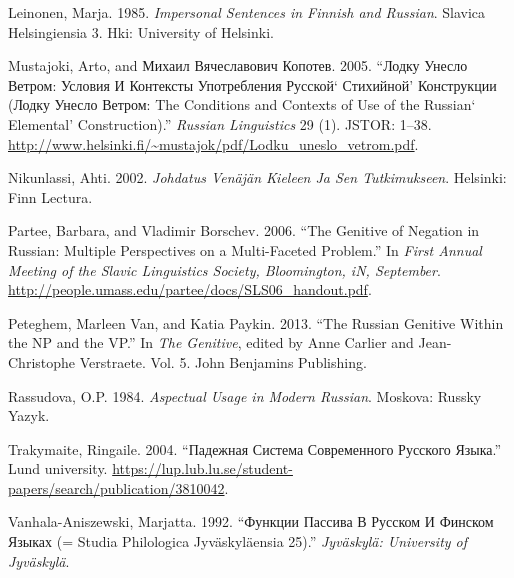 \documentclass[]{scrreprt}
\begin{document}
Leinonen, Marja. 1985. \emph{Impersonal Sentences in Finnish and
Russian}. Slavica Helsingiensia 3. Hki: University of Helsinki. \\

Mustajoki, Arto, and Михаил Вячеславович Копотев. 2005. ``Лодку Унесло
Ветром: Условия И Контексты Употребления Русской` Стихийной' Конструкции
(Лодку Унесло Ветром: The Conditions and Contexts of Use of the Russian`
Elemental' Construction).'' \emph{Russian Linguistics} 29 (1). JSTOR:
1--38.
\url{http://www.helsinki.fi/~mustajok/pdf/Lodku_uneslo_vetrom.pdf}. \\

Nikunlassi, Ahti. 2002. \emph{Johdatus Venäjän Kieleen Ja Sen
Tutkimukseen}. Helsinki: Finn Lectura. \\

Partee, Barbara, and Vladimir Borschev. 2006. ``The Genitive of Negation
in Russian: Multiple Perspectives on a Multi-Faceted Problem.'' In
\emph{First Annual Meeting of the Slavic Linguistics Society,
Bloomington, iN, September}.
\url{http://people.umass.edu/partee/docs/SLS06_handout.pdf}. \\

Peteghem, Marleen Van, and Katia Paykin. 2013. ``The Russian Genitive
Within the NP and the VP.'' In \emph{The Genitive}, edited by Anne
Carlier and Jean-Christophe Verstraete. Vol. 5. John Benjamins
Publishing. \\

Rassudova, O.P. 1984. \emph{Aspectual Usage in Modern Russian}. Moskova:
Russky Yazyk. \\

Trakymaite, Ringaile. 2004. ``Падежная Система Современного Русского
Языка.'' Lund university.
\url{https://lup.lub.lu.se/student-papers/search/publication/3810042}. \\

Vanhala-Aniszewski, Marjatta. 1992. ``Функции Пассива В Русском И
Финском Языках (= Studia Philologica Jyväskyläensia 25).''
\emph{Jyväskylä: University of Jyväskylä}. \\
\end{document}
